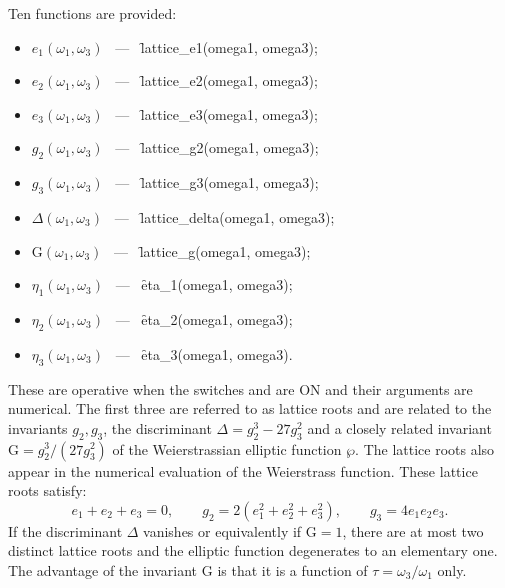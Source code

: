 Ten functions are provided:
\begin{itemize}
\item $e_1(\omega_1, \omega_3)$ \ --- \ \f{lattice\_e1(omega1, omega3)};
\item $e_2(\omega_1, \omega_3)$ \ --- \ \f{lattice\_e2(omega1, omega3)};
\item $e_3(\omega_1, \omega_3)$ \ --- \ \f{lattice\_e3(omega1, omega3)};
\item $g_2(\omega_1, \omega_3)$ \ --- \ \f{lattice\_g2(omega1, omega3)};
\item $g_3(\omega_1, \omega_3)$ \ --- \ \f{lattice\_g3(omega1, omega3)};
\item $\Delta(\omega_1, \omega_3)$ \ --- \ \f{lattice\_delta(omega1, omega3)};
\item $\mathrm{G}(\omega_1, \omega_3)$ \ --- \ \f{lattice\_g(omega1, omega3)};
\item $\eta_1(\omega_1, \omega_3)$ \ --- \ \f{eta\_1(omega1, omega3)};
\item $\eta_2(\omega_1, \omega_3)$ \ --- \ \f{eta\_2(omega1, omega3)};
\item $\eta_3(\omega_1, \omega_3)$ \ --- \ \f{eta\_3(omega1, omega3)}.
\end{itemize}

These are operative when the switches  and  are ON
and their arguments are numerical. The first three are referred to as lattice
roots and are related to the invariants
$g_2, g_3$, the discriminant $\Delta = g_2^3-27g_3^2$ and a closely related
invariant $\mathrm{G} = g_2^3/(27 g_3^2)$ of the Weierstrassian
elliptic function $\wp$. The lattice roots also appear in the numerical
evaluation of the Weierstrass function. These lattice roots satisfy:
\[e_1+e_2+e_3=0,\qquad g_2=2(e_1^2+e_2^2+e_3^2),\qquad g_3= 4e_1e_2e_3.\]
If the discriminant $\Delta$ vanishes or equivalently if $\mathrm{G} = 1$,
there are at most two distinct lattice roots and the elliptic function
degenerates to an elementary one. The advantage of the invariant
$\mathrm{G}$ is that it is a function of $\tau = \omega_3/\omega_1$ only.

